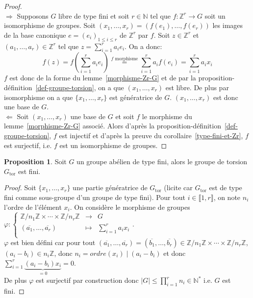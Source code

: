 \documentclass{article}
\newcommand{\Z}{\mathbb{Z}}
\newcommand{\N}{\mathbb{N}}
\newcommand{\Gt}{G_{\mathrm{tor}}}
\newcommand{\dis}{\displaystyle}
\newcommand{\nt}[1]{\llbracket  #1 \rrbracket }
\theoremstyle{definition}
\newtheorem{prop}{Proposition}
\theoremstyle{remark}
\newcommand{\app}[5]{#1:\left\{\begin{array}{rcl}
#2 & \longrightarrow & #3 \\
#4 & \longmapsto & #5  \\
\end{array}\right.
}
\begin{document}
\begin{proof}\hspace{.1em}\\
\underline{$\Rightarrow$} Supposons $G$ libre de type fini et soit $r\in\N$ tel que $f:\Z^r\to G$ soit un isomorphisme de groupes. Soit $(x_1, \ldots ,x_r)=(f(e_1),\ldots, f(e_r))$ les images de la base canonique $e=(e_i)_{1\leqslant i\leqslant r}$ de $\Z^r$ par $f$. Soit $z\in\Z^r$ et $(a_1,\ldots,a_r)\in\Z^r$ tel que $z=\dis\sum_{i=1}^r a_ie_i$. On a donc:
$$f(z)=f(\dis\sum_{i=1}^r a_i e_i)\stackrel{\textrm{$f$ morphisme}}{=}\dis\sum_{i=  1}^r a_if(e_i)=\dis\sum_{i=  1}^r a_ix_i$$
$f$ est donc de la forme du lemme~\ref{morphisme-Zr-G} et de par la proposition-d\'efinition~\ref{def-groupe-torsion}, on a que $(x_1, \ldots ,x_r)$ est libre. De plus par isomorphisme on a que $\{x_1, \ldots ,x_r\}$ est génératrice de $G$. $(x_1, \ldots ,x_r)$ est donc une base de $G$.\\
\underline{$\Leftarrow$} Soit $(x_1, \ldots ,x_r)$ une base de $G$ et soit $f$ le morphisme du lemme~\ref{morphisme-Zr-G} associ\'e. Alors d'apr\`es la proposition-d\'efinition~\ref{def-groupe-torsion}, $f$ est injectif et d'apr\`es la preuve du corollaire~\ref{type-fini-et-Zr}, $f$ est surjectif, i.e. $f$ est un isomorphisme de groupes.
\end{proof}

\begin{prop}
Soit $G$ un groupe abélien de type fini, alors le groupe de torsion $\Gt$ est fini.
\end{prop}

\begin{proof}
Soit $\{x_1, \ldots ,x_r\}$ une partie génératrice de $\Gt$ (licite car $\Gt$ est de type fini comme sous-groupe d'un groupe de type fini). Pour tout $i \in \nt{1,r}$, on note $n_i$ l'ordre de l'élément $x_i$. On considère le morphisme de groupes $\app{\varphi}{\Z/n_1\Z \times \cdots \times \Z/n_r\Z}{G}{(\overline{a_1}, \ldots, \overline{a_r})}{\dis \sum_{i=1}^r a_ix_i}$.\\
$\varphi$ est bien défini car pour tout $(\overline{a_1}, \ldots, \overline{a_r})=(\overline{b_1}, \ldots, \overline{b_r}) \in \Z/n_1\Z \times \cdots \times \Z/n_r\Z$, $(a_i-b_i)\in n_i\Z$, donc $n_i=ordre(x_i)\mid (a_i-b_i)$ et donc $\dis \sum_{i=1}^r \underbrace{(a_i-b_i)x_i}_{=0}=0$.\\
De plus $\varphi$ est surjectif par construction  donc $\vert G \vert \leqslant \dis \prod_{i=1}^r n_i \in \N^*$ i.e. $G$ est fini.
\end{proof}
\end{document}
